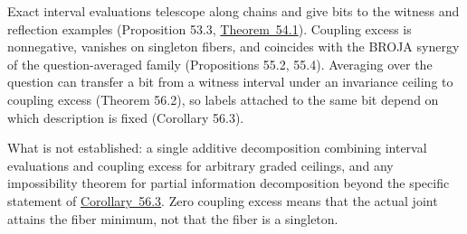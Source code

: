 
Exact interval evaluations telescope along chains and give bits to the witness and reflection examples (Proposition 53.3, \hyperlink{stmt:54.1}{Theorem~54.1}). Coupling excess is nonnegative, vanishes on singleton fibers, and coincides with the BROJA synergy of the question-averaged family (Propositions 55.2, 55.4). Averaging over the question can transfer a bit from a witness interval under an invariance ceiling to coupling excess (Theorem 56.2), so labels attached to the same bit depend on which description is fixed (Corollary 56.3).

What is not established: a single additive decomposition combining interval evaluations and coupling excess for arbitrary graded ceilings, and any impossibility theorem for partial information decomposition beyond the specific statement of \hyperlink{stmt:56.3}{Corollary~56.3}. Zero coupling excess means that the actual joint attains the fiber minimum, not that the fiber is a singleton.

